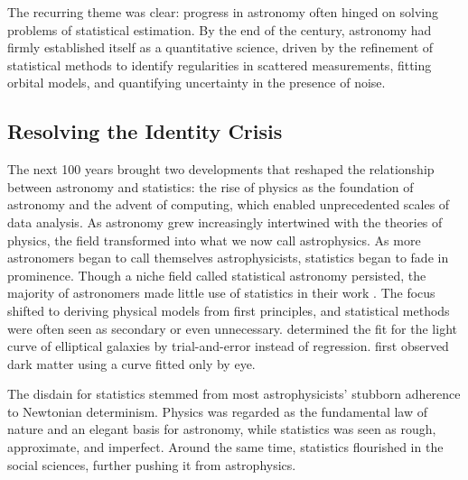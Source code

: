 \documentclass[preprint,longauthor]{aastex631}
\numberwithin{equation}{section}
\begin{document}
The recurring theme was clear: progress in astronomy often hinged on solving problems of statistical estimation. By the end of the century, astronomy had firmly established itself as a quantitative science, driven by the refinement of statistical methods to identify regularities in scattered measurements, fitting orbital models, and quantifying uncertainty in the presence of noise.

\subsection{Resolving the Identity Crisis}

The next 100 years brought two developments that reshaped the relationship between astronomy and statistics: the rise of physics as the foundation of astronomy and the advent of computing, which enabled unprecedented scales of data analysis. As astronomy grew increasingly intertwined with the theories of physics, the field transformed into what we now call astrophysics. As more astronomers began to call themselves astrophysicists, statistics began to fade in prominence. Though a niche field called statistical astronomy persisted, the majority of astronomers made little use of statistics in their work \citep{feigelsonStatisticalChallengesModern2004}. The focus shifted to deriving physical models from first principles, and statistical methods were often seen as secondary or even unnecessary. \citet{hubbleDistributionLuminosityElliptical1930} determined the fit for the light curve of elliptical galaxies by trial-and-error instead of regression. \citet{zwickyMassesNebulaeClusters1937} first observed dark matter using a curve fitted only by eye.

The disdain for statistics stemmed from most astrophysicists' stubborn adherence to Newtonian determinism. Physics was regarded as the fundamental law of nature and an elegant basis for astronomy, while statistics was seen as rough, approximate, and imperfect. Around the same time, statistics flourished in the social sciences, further pushing it from astrophysics.
\end{document}
